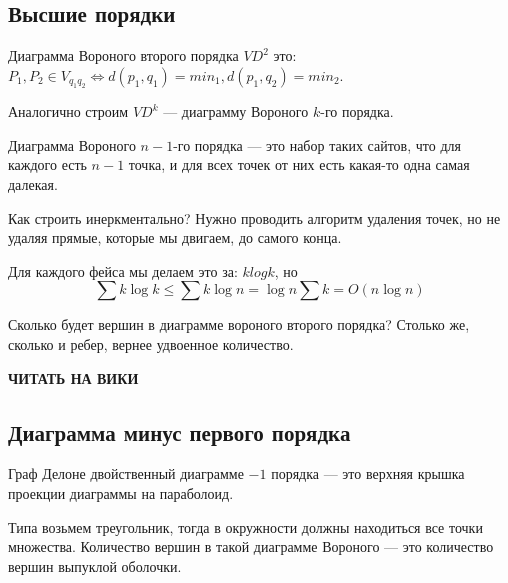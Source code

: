 \documentclass[11pt]{article}
\begin{document}
\subsection{Высшие порядки}
\label{sec-24-5}
Диаграмма Вороного второго порядка $VD^2$ это: $P_1, P_2 \in
   V_{q_1q_2} ⇔ d(p_1, q_1) = min_1, d(p_1,q_2) = min_2$.

Аналогично строим $VD^k$ --- диаграмму Вороного $k$-го порядка.

Диаграмма Вороного $n-1$-го порядка --- это набор таких сайтов, что
для каждого есть $n-1$ точка, и для всех точек от них есть какая-то
одна самая далекая.

Как строить инеркментально? Нужно проводить алгоритм удаления
точек, но не удаляя прямые, которые мы двигаем, до самого конца.

Для каждого фейса мы делаем это за: $klogk$, но \[\sum{k\log{k}}
   \le \sum{k\log{n}} = \log{n}\sum{k} = O(n\log{n})\]

Сколько будет вершин в диаграмме вороного второго порядка? Столько
же, сколько и ребер, вернее удвоенное количество.

\textbf{ЧИТАТЬ НА ВИКИ}
\subsection{Диаграмма минус первого порядка}
\label{sec-24-6}
Граф Делоне двойственный диаграмме $-1$ порядка --- это верхняя крышка
проекции диаграммы на параболоид.

Типа возьмем треугольник, тогда в окружности должны находиться все
точки множества. Количество вершин в такой диаграмме Вороного ---
это количество вершин выпуклой оболочки.
\end{document}
